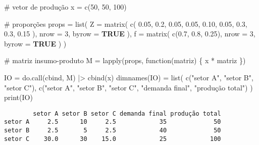 \documentclass[
  letterpaper,
  DIV=11,
  numbers=noendperiod]{scrreprt}
\newenvironment{Shaded}{\begin{snugshade}}{\end{snugshade}}
\newcommand{\AttributeTok}[1]{\textcolor[rgb]{0.80,0.80,0.80}{#1}}
\newcommand{\CommentTok}[1]{\textcolor[rgb]{0.50,0.62,0.50}{#1}}
\newcommand{\ConstantTok}[1]{\textcolor[rgb]{0.86,0.64,0.64}{\textbf{#1}}}
\newcommand{\ControlFlowTok}[1]{\textcolor[rgb]{0.94,0.87,0.69}{#1}}
\newcommand{\DecValTok}[1]{\textcolor[rgb]{0.86,0.86,0.80}{#1}}
\newcommand{\FloatTok}[1]{\textcolor[rgb]{0.75,0.75,0.82}{#1}}
\newcommand{\FunctionTok}[1]{\textcolor[rgb]{0.94,0.94,0.56}{#1}}
\newcommand{\NormalTok}[1]{\textcolor[rgb]{0.80,0.80,0.80}{#1}}
\newcommand{\OtherTok}[1]{\textcolor[rgb]{0.94,0.94,0.56}{#1}}
\newcommand{\SpecialCharTok}[1]{\textcolor[rgb]{0.86,0.64,0.64}{#1}}
\newcommand{\StringTok}[1]{\textcolor[rgb]{0.80,0.58,0.58}{#1}}
\begin{document}
\begin{Shaded}
\begin{Highlighting}[numbers=left,,]
\CommentTok{\# vetor de produção}
\NormalTok{x }\OtherTok{=} \FunctionTok{c}\NormalTok{(}\DecValTok{50}\NormalTok{, }\DecValTok{50}\NormalTok{, }\DecValTok{100}\NormalTok{)}

\CommentTok{\# proporções}
\NormalTok{props }\OtherTok{=} \FunctionTok{list}\NormalTok{(}
  \AttributeTok{Z =} \FunctionTok{matrix}\NormalTok{(}
    \FunctionTok{c}\NormalTok{(}
      \FloatTok{0.05}\NormalTok{, }\FloatTok{0.2}\NormalTok{, }\FloatTok{0.05}\NormalTok{,}
      \FloatTok{0.05}\NormalTok{, }\FloatTok{0.10}\NormalTok{, }\FloatTok{0.05}\NormalTok{,}
      \FloatTok{0.3}\NormalTok{, }\FloatTok{0.3}\NormalTok{, }\FloatTok{0.15}
\NormalTok{    ),}
    \AttributeTok{nrow =} \DecValTok{3}\NormalTok{,}
    \AttributeTok{byrow =} \ConstantTok{TRUE}
\NormalTok{  ),}
  \AttributeTok{f =} \FunctionTok{matrix}\NormalTok{(}
    \FunctionTok{c}\NormalTok{(}\FloatTok{0.7}\NormalTok{, }\FloatTok{0.8}\NormalTok{, }\FloatTok{0.25}\NormalTok{),}
    \AttributeTok{nrow =} \DecValTok{3}\NormalTok{,}
    \AttributeTok{byrow =} \ConstantTok{TRUE}
\NormalTok{  )}
\NormalTok{)}

\CommentTok{\# matriz insumo{-}produto}
\NormalTok{M }\OtherTok{=} \FunctionTok{lapply}\NormalTok{(props, }\ControlFlowTok{function}\NormalTok{(matriz) \{}
\NormalTok{  x }\SpecialCharTok{*}\NormalTok{ matriz}
\NormalTok{\})}

\NormalTok{IO }\OtherTok{=} \FunctionTok{do.call}\NormalTok{(cbind, M) }\SpecialCharTok{|\textgreater{}}
\FunctionTok{cbind}\NormalTok{(x)}
\FunctionTok{dimnames}\NormalTok{(IO) }\OtherTok{=} \FunctionTok{list}\NormalTok{(}
  \FunctionTok{c}\NormalTok{(}\StringTok{"setor A"}\NormalTok{, }\StringTok{"setor B"}\NormalTok{, }\StringTok{"setor C"}\NormalTok{),}
  \FunctionTok{c}\NormalTok{(}\StringTok{"setor A"}\NormalTok{, }\StringTok{"setor B"}\NormalTok{, }\StringTok{"setor C"}\NormalTok{, }\StringTok{"demanda final"}\NormalTok{, }\StringTok{"produção total"}\NormalTok{)}
\NormalTok{)}
\FunctionTok{print}\NormalTok{(IO)}
\end{Highlighting}
\end{Shaded}

\begin{verbatim}
        setor A setor B setor C demanda final produção total
setor A     2.5      10     2.5            35             50
setor B     2.5       5     2.5            40             50
setor C    30.0      30    15.0            25            100
\end{verbatim}
\end{document}
